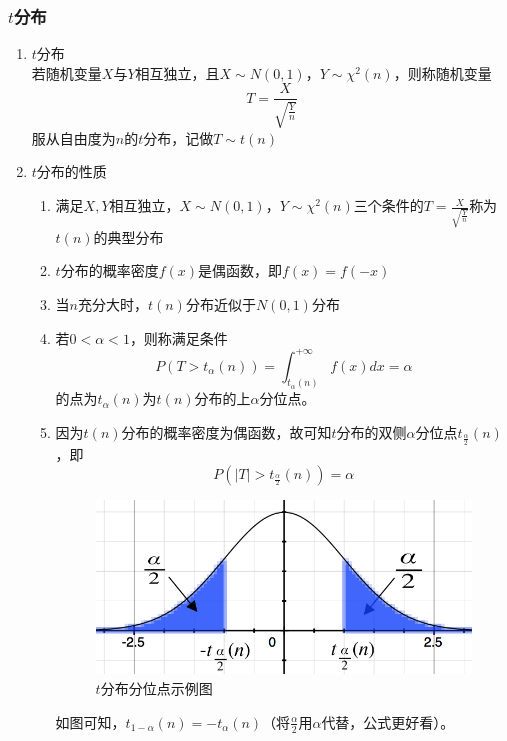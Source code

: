 \subsubsection{$t$分布}
\begin{enumerate}
	\item $t$分布 \\
	若随机变量$X$与$Y$相互独立，且$X\sim N(0,1)$，$Y\sim \chi^2(n)$，则称随机变量
	\begin{equation}
		T = \frac{X}{\sqrt{\frac{Y}{n}}}
	\end{equation}
	服从自由度为$n$的$t$分布，记做$T \sim t(n)$

	\item $t$分布的性质
	\begin{enumerate}
		\item 满足$X,Y$相互独立，$X\sim N(0,1)$，$Y\sim \chi^2(n)$三个条件的$T = \frac{X}{\sqrt{\frac{Y}{n}}}$称为$t(n)$的典型分布
		\item $t$分布的概率密度$f(x)$是偶函数，即$f(x) = f(-x)$
		\item 当$n$充分大时，$t(n)$分布近似于$N(0,1)$分布
		\item 若$0<\alpha<1$，则称满足条件
		\begin{equation}
			P(T > t_{\alpha}(n)) = \int_{t_{\alpha}(n)}^{+\infty}f(x)dx = \alpha
		\end{equation}
		的点为$t_{\alpha}(n)$为$t(n)$分布的上$\alpha$分位点。
		\item 因为$t(n)$分布的概率密度为偶函数，故可知$t$分布的双侧$\alpha$分位点$t_{\frac{\alpha}{2}}(n)$，即
		\begin{equation}
			P\left(|T|>t_{\frac{\alpha}{2}}(n)\right) = \alpha
		\end{equation}
		\begin{figure}[htbp]
			\centering
			\includegraphics[scale=0.9]{images/t分布分位点}
			\caption{$t$分布分位点示例图}
		\end{figure}
		如图可知，$t_{1-\alpha}(n) = -t_{\alpha}(n)$（将$\frac{\alpha}{2}$用$\alpha$代替，公式更好看）。
	\end{enumerate}
\end{enumerate}

